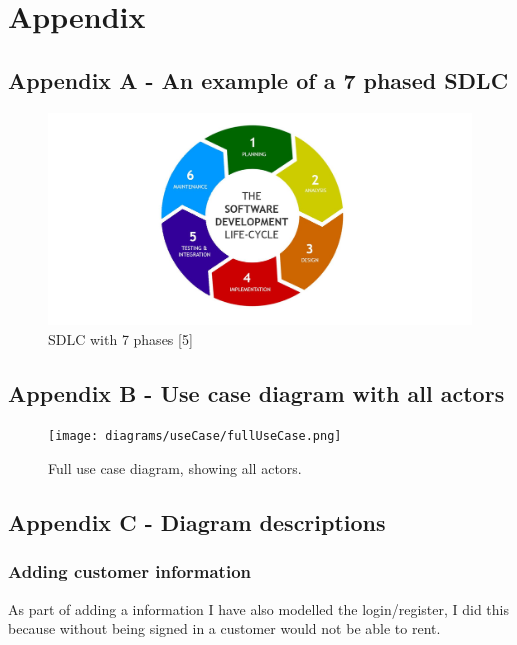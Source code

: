 \section{Appendix}

  \label{sec:AppendixA}
  \subsection{Appendix A - An example of a 7 phased SDLC}
    \begin{figure}[H]
      \centering
      \includegraphics[width=12cm]{assets/sdlc7.jpg}
      \caption{SDLC with 7 phases [5]}
      \label{fig:SDLC7}
    \end{figure}
  
  \newpage

  \begin{landscape}
    \label{sec:AppendixB}
    \subsection{Appendix B - Use case diagram with all actors}
      \begin{figure}[H]
        \centering
        \texttt{[image: diagrams/useCase/fullUseCase.png]}
        \caption{Full use case diagram, showing all actors.}
        \label{fig:UCfull}
      \end{figure}
  \end{landscape}
  \newpage

  \subsection{Appendix C - Diagram descriptions}
    \label{sec:AppendixC}

    \subsubsection{Adding customer information}
      As part of adding a information I have also modelled the login/register, I did this because without being signed in a customer
      would not be able to rent.

